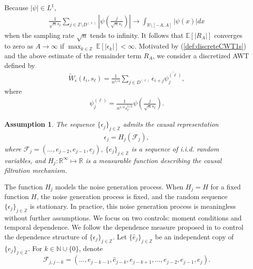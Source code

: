 \documentclass{amsart}
\newtheorem{Assumption}{Assumption}
\begin{document}
Because $|\psi|\in L^{1}$,
\begin{align*}
\frac{1}{\sqrt{n}s_{\ell}}\underset{j\in \mathbb{Z} \setminus D^{(\ell)}}{\sum}\left|\psi\left(\frac{j}{\sqrt{n}s_{\ell}}\right)\right|
\rightarrow  \int_{\mathbb{R}\setminus[-A,A]}\left|\psi\left(x\right)\right| dx
\end{align*}
when the sampling rate $\sqrt{n}$ tends to infinity.
It follows that $\mathbb{E}[|R_{A}|]$ converges to zero as $A\rightarrow\infty$ if
$\max_{k\in \mathbb{Z}}\ \mathbb{E}\left[|\epsilon_{k}|\right]<\infty$.
Motivated by (\ref{def:discreteCWT1s}) and the above estimate of the remainder term $R_{A}$, we consider a discretized AWT defined by
\begin{align}\label{def:discreteCWT2}
\widetilde{W}_{\epsilon}(t_{i},s_{\ell}) =\frac{1}{n^{1/4}}\underset{j\in D^{(\ell)}}{\sum}\epsilon_{i+j}\overline{\psi_{j}^{(\ell)}},
\end{align}
where
\begin{align}\label{def:discrete_psi}
\psi_{j}^{(\ell)}
=\frac{1}{n^{1/4}s_{\ell}^{1/2}}\psi\left(\frac{j}{\sqrt{n}s_{\ell}}\right).
\end{align}
\begin{Assumption}\label{assumption:causal}
The sequence $\{\epsilon_{j}\}_{j\in \mathbb{Z}}$
admits the causal representation \cite{wu2005nonlinear}
\begin{align}\label{causal_rep}
\epsilon_{j} = H_{j}(\mathcal{F}_{j}),
\end{align}
where $\mathcal{F}_{j}=(\ldots,e_{j-2},e_{j-1},e_{j})$, $\{e_{j}\}_{j\in \mathbb{Z}}$  is a sequence of i.i.d. random variables, and
$H_{j}: \mathbb{R}^{\infty}\mapsto \mathbb{R}$ is a measurable function
describing the causal filtration mechanism.
\end{Assumption}
The function $H_j$ models the noise generation process. When $H_j=H$ for a fixed function $H$,
the noise generation process is fixed, and the random sequence $\{\epsilon_j\}_{j\in \mathbb{Z}}$
is stationary.
In practice, this noise generation process is meaningless without further assumptions.
We focus on two controls: moment conditions and temporal dependence.
We follow the dependence measure proposed in \cite{wu2005nonlinear} to control the dependence structure of $\{\epsilon_j\}_{j\in \mathbb{Z}}$.
Let $\{\widehat{e}_{j}\}_{j\in \mathbb{Z}}$ be an independent copy of $\{e_{j}\}_{j\in \mathbb{Z}}$.
For $k\in \mathbb{N}\cup\{0\}$, denote $$\mathcal{F}_{j,j-k}=(\ldots,e_{j-k-1},\widehat{e}_{j-k},e_{j-k+1},\ldots,e_{j-2},e_{j-1},e_{j}).$$
\end{document}
